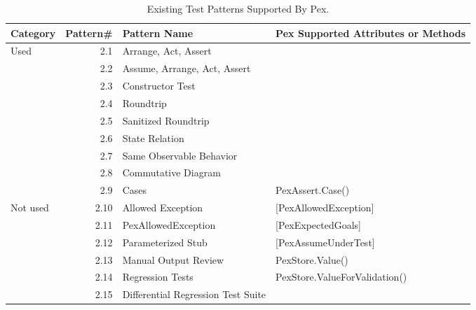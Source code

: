 \setlength{\tabcolsep}{2pt}
\begin{table}[t]
\begin{center}
\centering \caption {\label{tab:patterns} Existing Test Patterns Supported By Pex.} \vspace*{0.1in}
\begin {tabular} {|l|r|l|l|}
\hline
Category					&	Pattern\#	&	Pattern Name												&	Pex Supported Attributes or Methods\\
\hline
Used							&	2.1				&	Arrange, Act, Assert								&	\\
\cline{2-4}
									& 2.2				&	Assume, Arrange, Act, Assert  			&	\\
\cline{2-4}
									&	2.3				&	Constructor Test										&	\\
\cline{2-4}
									& 2.4				&	Roundtrip														&	\\
\cline{2-4}
									& 2.5				&	Sanitized Roundtrip									&	\\
\cline{2-4}
									& 2.6				&	State Relation											&	\\
\cline{2-4}
									&	2.7				&	Same Observable Behavior						&	\\
\cline{2-4}
									&	2.8				&	Commutative Diagram									&	\\
\cline{2-4}
									& 2.9				&	Cases																&	PexAssert.Case() 			\\ 
\hline
Not used					& 2.10			&	Allowed Exception										&	[PexAllowedException]	\\
\cline{2-4}
									& 2.11			&	PexAllowedException									&	[PexExpectedGoals]		\\
\cline{2-4}
									&	2.12			&	Parameterized Stub									&	[PexAssumeUnderTest]	\\
\cline{2-4}
									&	2.13			&	Manual Output Review								&	PexStore.Value()			\\
\cline{2-4}
									&	2.14			&	Regression Tests										&	PexStore.ValueForValidation()\\
\cline{2-4}			
									& 2.15			&	Differential Regression Test Suite	&	\\
\hline
\end{tabular}
\end{center}
\end{table}


